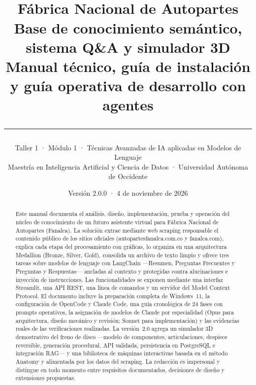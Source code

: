 \documentclass[11pt,letterpaper,oneside]{report}
\title{\vspace{-1cm}{\color{fnarojo}\rule{\linewidth}{2pt}}\\[0.6em]
  {\Huge\bfseries\color{fnagris} Fábrica Nacional de Autopartes}\\[0.4em]
  {\LARGE Base de conocimiento semántico, sistema Q\&A y simulador 3D}\\[0.3em]
  {\large Manual técnico, guía de instalación y guía operativa de desarrollo con agentes}\\[0.4em]
  {\color{fnarojo}\rule{\linewidth}{2pt}}}
\author{Taller 1 · Módulo 1 · Técnicas Avanzadas de IA aplicadas en Modelos de Lenguaje\\
  Maestría en Inteligencia Artificial y Ciencia de Datos · Universidad Autónoma de Occidente}
\date{Versión 2.0.0 · 4 de noviembre de 2026}
\begin{document}
\maketitle
\thispagestyle{empty}

\begin{abstract}
\noindent Este manual documenta el análisis, diseño, implementación, prueba y operación del núcleo de
conocimiento de un futuro asistente virtual para Fábrica Nacional de Autopartes (Fanalca). La solución extrae
mediante web scraping responsable el contenido público de los sitios oficiales (autopartesfanalca.com.co y
fanalca.com), explica cada etapa del procesamiento con gráficas, lo organiza en una arquitectura Medallion
(Bronze, Silver, Gold), consolida un archivo de texto limpio y ofrece tres tareas sobre modelos de lenguaje
con LangChain ---Resumen, Preguntas Frecuentes y Preguntas y Respuestas--- ancladas al contexto y protegidas
contra alucinaciones e inyección de instrucciones. Las funcionalidades se exponen mediante una interfaz
Streamlit, una API REST, una línea de comandos y un servidor del Model Context Protocol. El documento incluye la
preparación completa de Windows~11, la configuración de OpenCode y Claude Code, una guía cronológica de 24 fases
con prompts operativos, la asignación de modelos de Claude por especialidad (Opus para arquitectura, diseño
mecánico y revisión; Sonnet para implementación) y las evidencias reales de las verificaciones realizadas. La
versión~2.0 agrega un simulador 3D demostrativo del freno de disco ---modelo de componentes, articulaciones,
despiece reversible, generación procedural, API validada, persistencia en PostgreSQL e integración RAG--- y una
biblioteca de máquinas interactivas basada en el método Anatomy y alimentada por los datos del scraping. La redacción es impersonal y
distingue en todo momento entre requisitos documentados, decisiones de diseño y extensiones propuestas.
\end{abstract}

\tableofcontents
\listoffigures
\listoftables
\cleardoublepage
{}














\end{document}
